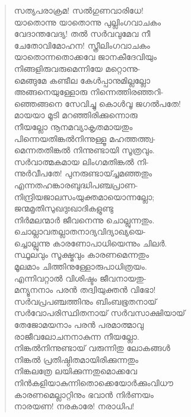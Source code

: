 \begin{verse}
സത്യപരാക്രമ! സല്‍ഗുണവാരിധേ!\\
യാതൊന്നു യാതൊന്നു പുല്ലിംഗവാചകം\\
വേദാന്തവേദ്യ! തല്‍ സര്‍വവുമേവ നീ\\
ചേതോവിമോഹന! സ്ത്രീലിംഗവാചകം\\
യാതൊന്നതൊക്കവേ ജാനകീദേവിയും\\
നിങ്ങളിരുവരുമെന്നിയേ മറ്റൊന്നു-\\
മെങ്ങുമേ കണ്ടീല കേള്‍പ്പാനുമില്ലല്ലോ\\
അങ്ങനെയുള്ളോരു നിന്നെത്തിരഞ്ഞറി-\\
ഞ്ഞെങ്ങനെ സേവിച്ചു കൊള്‍വൂ ജഗല്‍പതേ!\\
മായയാ മൂടി മറഞ്ഞിരിക്കുന്നൊരു\\
നീയല്ലോ നൂനമവ്യാകൃതമായതും\\
പിന്നെയതിങ്കല്‍നിന്നുള്ളൂ മഹത്തത്ത്വ-\\
മെന്നതതിങ്കല്‍ നിന്നുണ്ടായി സൂത്രവും.\\
സര്‍വാത്മകമായ ലിംഗമതിങ്കല്‍ നി-\\
ന്നുര്‍വീപതേ! പുനരുണ്ടായ്ച്ചമഞ്ഞതും\\
എന്നതഹങ്കാരബുദ്ധിപഞ്ചപ്രാണ-\\
നിന്ദ്രിയജാലസംയുക്തമായൊന്നല്ലോ;\\
ജന്മമൃതിസുഖദുഃഖാദികളുണ്ടു\\
നിര്‍മലന്മാര്‍ ജീവനെന്നു ചൊല്ലുന്നതും.\\
ചൊല്ലാവതല്ലാതനാദ്യവിദ്യാഖ്യയെ-\\
ച്ചൊല്ലുന്നു കാരണോപാധിയെന്നും ചില‍ര്‍.\\
സ്ഥൂലവും സൂക്ഷ്മവും കാരണമെന്നതും\\
മൂലമാം ചിത്തിനുള്ളോരുപാധിത്രയം.\\
എന്നിവറ്റാല്‍ വിശിഷ്ടം ജീവനായതു-\\
മന്യൂനനാം പരന്‍ തദ്വിയുക്തന്‍ വിഭോ!\\
സര്‍വപ്രപഞ്ചത്തിനും ബിംബഭൂതനായ്\\
സര്‍വോപരിസ്ഥിതനായ് സര്‍വസാക്ഷിയായ്\\
തേജോമയനാം പരന്‍ പരമാത്മാവു\\
രാജീവലോചനനാകുന്ന നീയല്ലോ.\\
നിങ്കല്‍നിന്നുണ്ടായ് വരുന്നിതു ലോകങ്ങള്‍\\
നിങ്കല്‍ പ്രതിഷ്ഠിതമായിരിക്കുന്നതും\\
നിങ്കലത്രേ ലയിക്കുന്നതുമൊക്കവേ\\
നിന്‍കളിയാകുന്നിതൊക്കെയോര്‍ക്കുംവിധൗ\\
കാരണമെല്ലാറ്റിനും ഭവാന്‍ നിര്‍ണയം\\
നാരയണ! നരകാരേ! നരാധിപ!\\

\end{verse}
